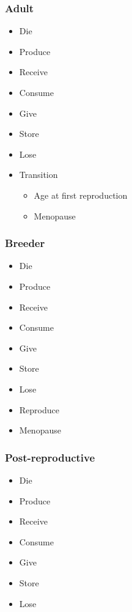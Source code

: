\documentclass{article}
\begin{document}
\subsubsection{Adult}

\begin{itemize}
    \item Die
    \item Produce
    \item Receive
    \item Consume
    \item Give
    \item Store
    \item Lose
    \item Transition
    \begin{itemize}
        \item Age at first reproduction
        \item Menopause
    \end{itemize}
\end{itemize}

\subsubsection{Breeder}

\begin{itemize}
    \item Die
    \item Produce
    \item Receive
    \item Consume
    \item Give
    \item Store
    \item Lose
    \item Reproduce
    \item Menopause
\end{itemize}

\subsubsection{Post-reproductive}

\begin{itemize}
    \item Die
    \item Produce
    \item Receive
    \item Consume
    \item Give
    \item Store
    \item Lose
\end{itemize}
\end{document}

